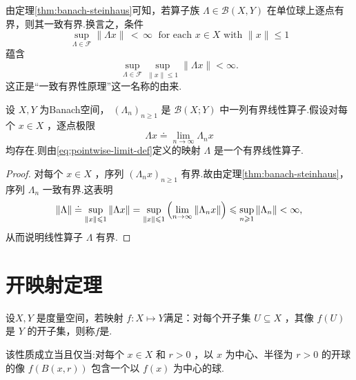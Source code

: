 \begin{remark}\label{rem:uniform-boundedness-pointwise}
由定理\ref{thm:banach-steinhaus}可知，若算子族 $\Lambda  \in  \mathcal{B}\left( {X,Y}\right)$ 在单位球上逐点有界，则其一致有界.换言之，条件
\[
\mathop{\sup }\limits_{{\Lambda  \in  \mathcal{F}}}\| {\Lambda x}\| \, < \,\infty \;\text{ for each }x \in  X\text{ with }\| x\|  \leq  1
\]
蕴含
\[
\mathop{\sup }\limits_{{\Lambda  \in  \mathcal{F}}}\mathop{\sup }\limits_{{\| x\|  \leq  1}}\| {\Lambda x}\|  < \infty .
\]
这正是“一致有界性原理”这一名称的由来.
\end{remark}

\begin{corollary}[逐点极限的连续性]\label{cor:pointwise-limit-continuous}
设 $X,Y$ 为Banach空间， ${\left( {\Lambda }_{n}\right) }_{n \geq  1}$ 是 $\mathcal{B}\left( {X;Y}\right)$ 中一列有界线性算子.假设对每个 $x \in  X$ ，逐点极限
\begin{equation}\tag{4.3}\label{eq:pointwise-limit-def}
{\Lambda x} \doteq  \mathop{\lim }\limits_{{n \rightarrow  \infty }}{\Lambda }_{n}x
\end{equation}
均存在.则由\eqref{eq:pointwise-limit-def}定义的映射 $\Lambda$ 是一个有界线性算子.
\end{corollary}

\begin{proof}
对每个 $x \in  X$ ，序列 ${\left( {\Lambda }_{n}x\right) }_{n \geq  1}$ 有界.故由定理\ref{thm:banach-steinhaus}，序列 ${\Lambda }_{n}$ 一致有界.这表明
\[
\| \Lambda \|  \doteq  \mathop{\sup }\limits_{{\| x\|  \leqslant  1}}\| {\Lambda x}\|  = \mathop{\sup }\limits_{{\| x\|  \leqslant  1}}\left( {\mathop{\lim }\limits_{{n \rightarrow  \infty }}\norm{{\Lambda }_{n}x}}\right)  \leqslant  \mathop{\sup }\limits_{{n \geqslant  1}}\norm{{\Lambda }_{n}} < \infty ,
\]
从而说明线性算子 $\Lambda$ 有界.
\end{proof}

\section{开映射定理}

\begin{definition}[开映射]
    设$X,Y$ 是度量空间，若映射 $f : X \mapsto  Y$满足：对每个开子集 $U \subseteq  X$ ，其像 $f\left( U\right)$ 是 $Y$ 的开子集，则称$f$是.
\end{definition}
该性质成立当且仅当:对每个 $x \in  X$ 和 $r > 0$ ，以 $x$ 为中心、半径为 $r > 0$ 的开球的像 $f\left( {B\left( {x,r}\right) }\right)$ 包含一个以 $f\left( x\right)$ 为中心的球.

